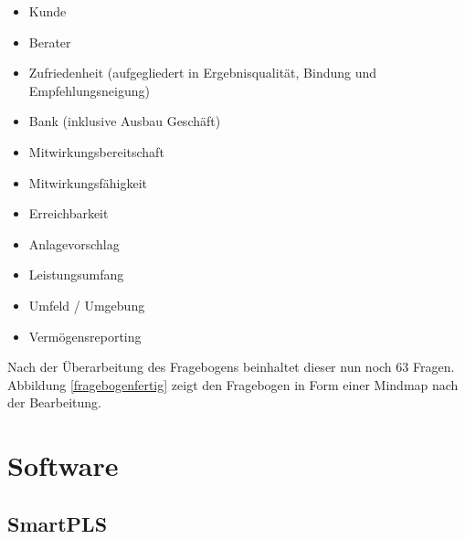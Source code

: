 \documentclass{article}\usepackage[]{graphicx}\usepackage[]{color}
\begin{document}
\begin{itemize}
\item Kunde
\item Berater
\item Zufriedenheit (aufgegliedert in Ergebnisqualität, Bindung und Empfehlungsneigung)
\item Bank (inklusive Ausbau Geschäft)
\item Mitwirkungsbereitschaft
\item Mitwirkungsfähigkeit
\item Erreichbarkeit
\item Anlagevorschlag
\item Leistungsumfang
\item Umfeld / Umgebung
\item Vermögensreporting
\end{itemize}

Nach der Überarbeitung des Fragebogens beinhaltet dieser nun noch 63 Fragen. Abbildung \ref{fragebogenfertig} zeigt den Fragebogen in Form einer Mindmap nach der Bearbeitung.




\label{fragebogenfertig}







\section{Software}%

\subsection{SmartPLS}
\end{document}
